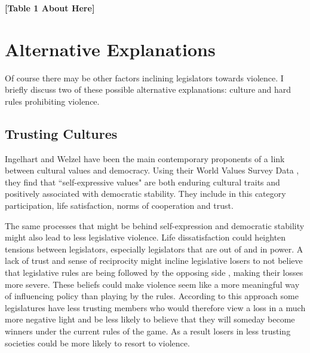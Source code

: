 \documentclass[a4paper]{article}\usepackage{graphicx, color}
\begin{document}
\begin{center}

    {\bf{[Table 1 About Here]}}

\end{center} 

\section{Alternative Explanations}

Of course there may be other factors inclining legislators towards violence. I briefly discuss two of these possible alternative explanations: culture and hard rules prohibiting violence.

\subsection{Trusting Cultures}

Ingelhart and Welzel \citep{Inglehart1988, Inglehart2005, Inglehart2010} have been the main contemporary proponents of a link between cultural values and democracy. Using their World Values Survey Data \citeyearpar[the most recent version is from][]{WVS2009}, they find that ``self-expressive values" are both enduring cultural traits and positively associated with democratic stability. They include in this category participation, life satisfaction, norms of cooperation and trust. 

The same processes that might be behind self-expression and democratic stability might also lead to less legislative violence. Life dissatisfaction could heighten tensions between legislators, especially legislators that are out of and in power. A lack of trust and sense of reciprocity might incline legislative losers to not believe that legislative rules are being followed by the opposing side \citep{Tyler1998}, making their losses more severe. These beliefs could make violence seem like a more meaningful way of influencing policy than playing by the rules. According to this approach some legislatures have less trusting members who would therefore view a loss in a much more negative light and be less likely to believe that they will someday become winners under the current rules of the game. As a result losers in less trusting societies could be more likely to resort to violence. 
\end{document}
